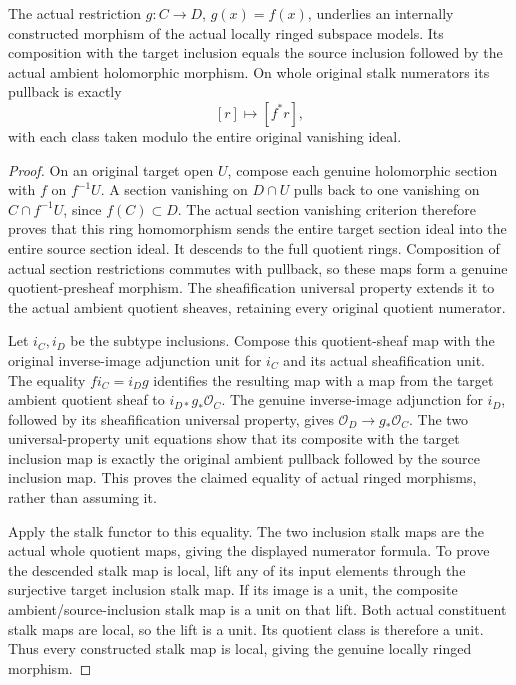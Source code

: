 \begin{theorem}
\label{hir:actual-analytic-subspace-holomorphic-map}
\leanok
The actual restriction $g:C\to D$, $g(x)=f(x)$, underlies an internally
constructed morphism of the actual locally ringed subspace models. Its
composition with the target inclusion equals the source inclusion followed
by the actual ambient holomorphic morphism. On whole original stalk
numerators its pullback is exactly
\[
 [r]\longmapsto[f^*r],
\]
with each class taken modulo the entire original vanishing ideal.
\end{theorem}
\begin{proof}
On an original target open $U$, compose each genuine holomorphic section
with $f$ on $f^{-1}U$. A section vanishing on $D\cap U$ pulls back to one
vanishing on $C\cap f^{-1}U$, since $f(C)\subset D$. The actual section
vanishing criterion therefore proves that this ring homomorphism sends
the entire target section ideal into the entire source section ideal.
It descends to the full quotient rings. Composition of actual section
restrictions commutes with pullback, so these maps form a genuine
quotient-presheaf morphism. The sheafification universal property extends
it to the actual ambient quotient sheaves, retaining every original
quotient numerator.

Let $i_C,i_D$ be the subtype inclusions. Compose this quotient-sheaf map
with the original inverse-image adjunction unit for $i_C$ and its actual
sheafification unit. The equality $f i_C=i_D g$ identifies the resulting
map with a map from the target ambient quotient sheaf to $i_{D*}g_*\mathcal
O_C$. The genuine inverse-image adjunction for $i_D$, followed by its
sheafification universal property, gives $\mathcal O_D\to g_*\mathcal O_C$.
The two universal-property unit equations show that its composite with
the target inclusion map is exactly the original ambient pullback
followed by the source inclusion map. This proves the claimed equality
of actual ringed morphisms, rather than assuming it.

Apply the stalk functor to this equality. The two inclusion stalk maps
are the actual whole quotient maps, giving the displayed numerator
formula. To prove the descended stalk map is local, lift any of its
input elements through the surjective target inclusion stalk map. If its
image is a unit, the composite ambient/source-inclusion stalk map is a
unit on that lift. Both actual constituent stalk maps are local, so the
lift is a unit. Its quotient class is therefore a unit. Thus every
constructed stalk map is local, giving the genuine locally ringed morphism.
\end{proof}

